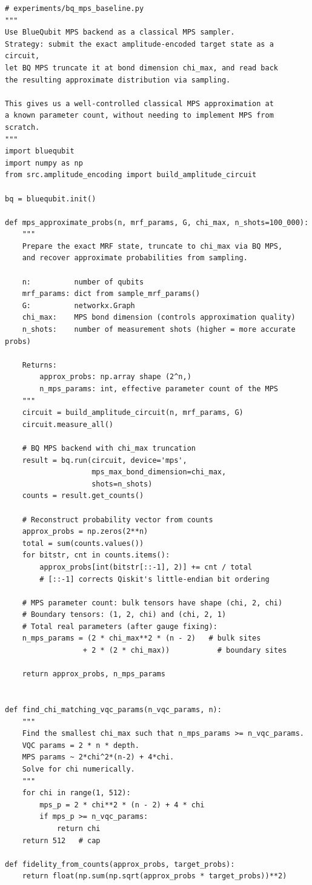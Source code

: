 \documentclass[11pt]{article}
\begin{document}
\begin{lstlisting}
# experiments/bq_mps_baseline.py
"""
Use BlueQubit MPS backend as a classical MPS sampler.
Strategy: submit the exact amplitude-encoded target state as a circuit,
let BQ MPS truncate it at bond dimension chi_max, and read back
the resulting approximate distribution via sampling.

This gives us a well-controlled classical MPS approximation at
a known parameter count, without needing to implement MPS from scratch.
"""
import bluequbit
import numpy as np
from src.amplitude_encoding import build_amplitude_circuit

bq = bluequbit.init()

def mps_approximate_probs(n, mrf_params, G, chi_max, n_shots=100_000):
    """
    Prepare the exact MRF state, truncate to chi_max via BQ MPS,
    and recover approximate probabilities from sampling.

    n:          number of qubits
    mrf_params: dict from sample_mrf_params()
    G:          networkx.Graph
    chi_max:    MPS bond dimension (controls approximation quality)
    n_shots:    number of measurement shots (higher = more accurate probs)

    Returns:
        approx_probs: np.array shape (2^n,)
        n_mps_params: int, effective parameter count of the MPS
    """
    circuit = build_amplitude_circuit(n, mrf_params, G)
    circuit.measure_all()

    # BQ MPS backend with chi_max truncation
    result = bq.run(circuit, device='mps',
                    mps_max_bond_dimension=chi_max,
                    shots=n_shots)
    counts = result.get_counts()

    # Reconstruct probability vector from counts
    approx_probs = np.zeros(2**n)
    total = sum(counts.values())
    for bitstr, cnt in counts.items():
        approx_probs[int(bitstr[::-1], 2)] += cnt / total
        # [::-1] corrects Qiskit's little-endian bit ordering

    # MPS parameter count: bulk tensors have shape (chi, 2, chi)
    # Boundary tensors: (1, 2, chi) and (chi, 2, 1)
    # Total real parameters (after gauge fixing):
    n_mps_params = (2 * chi_max**2 * (n - 2)   # bulk sites
                  + 2 * (2 * chi_max))           # boundary sites

    return approx_probs, n_mps_params


def find_chi_matching_vqc_params(n_vqc_params, n):
    """
    Find the smallest chi_max such that n_mps_params >= n_vqc_params.
    VQC params = 2 * n * depth.
    MPS params ~ 2*chi^2*(n-2) + 4*chi.
    Solve for chi numerically.
    """
    for chi in range(1, 512):
        mps_p = 2 * chi**2 * (n - 2) + 4 * chi
        if mps_p >= n_vqc_params:
            return chi
    return 512   # cap

def fidelity_from_counts(approx_probs, target_probs):
    return float(np.sum(np.sqrt(approx_probs * target_probs))**2)
\end{lstlisting}
\end{document}
